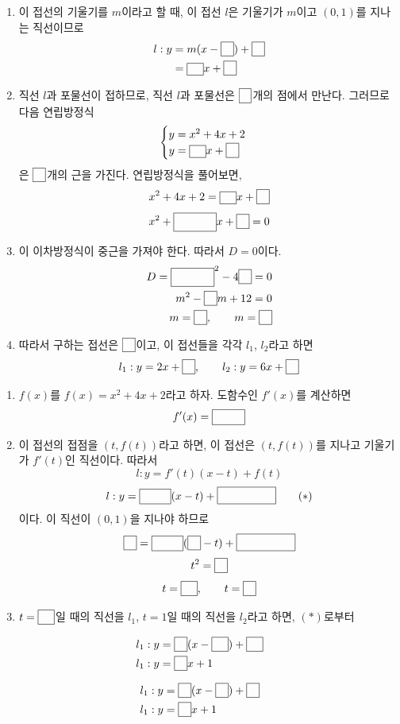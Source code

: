 \documentclass[a4paper]{oblivoir}
\newcounter{num}
\newcommand\pb[1]{\ensuremath{\fbox{\phantom{#1}}}}
\begin{document}
\noindent{}
\begin{enumerate}[(1)]
\item
이 접선의 기울기를 \(m\)이라고 할 때, 이 접선 \(l\)은 기울기가 \(m\)이고 \((0,1)\)를 지나는 직선이므로
\begin{align*}
l:y&=m(x-\pb0)+\pb1\\
&=\pb mx+\pb{1}
\end{align*}
\item
직선 \(l\)과 포물선이 접하므로, 직선 \(l\)과 포물선은 \pb{1}개의 점에서 만난다.
그러므로 다음 연립방정식
\[
\begin{cases}
y=x^2+4x+2\\
y=\pb mx+\pb{1}
\end{cases}
\]
은 \pb{1}개의 근을 가진다.
연립방정식을 풀어보면,
\[x^2+4x+2=\pb mx+\pb{1}\]
\[x^2+\pb{(-m+4)}x+\pb{1}=0\]
\item
이 이차방정식이 중근을 가져야 한다.
따라서 \(D=0\)이다.
\begin{align*}
D=\pb{(-m+4)}^2-4\pb{1}=0\\
m^2-\pb{8}m+12=0\\
m=\pb2,\qquad m=\pb6
\end{align*}
\item
따라서 구하는 접선은 \(\pb2\)이고, 이 접선들을 각각 \(l_1\), \(l_2\)라고 하면
\[l_1:y=2x+\pb{1},\qquad l_2:y=6x+\pb1\]
\end{enumerate}

\noindent{}
\begin{enumerate}[(1)]
\item
\(f(x)\)를 \(f(x)=x^2+4x+2\)라고 하자.
도함수인 \(f'(x)\)를 계산하면
\[f'(x)=\pb{2x+4}\]
\item
이 접선의 접점을 \((t,f(t))\)라고 하면, 이 접선은 \((t,f(t))\)를 지나고 기울기가 \(f'(t)\)인 직선이다.
따라서
\[l:y=f'(t)(x-t)+f(t)\]
\[l:y=\pb{2t+4}(x-t)+\pb{\(t^2+4t+2\)}\tag{\(\ast\)}\]
이다.
이 직선이 \((0,1)\)을 지나야 하므로
\[\pb{1}=\pb{2t+4}(\pb{0}-t)+\pb{\(t^2+4t+2\)}\]
\[t^2=\pb1\]
\[t=\pb{-1},\qquad t=\pb1\]
\item
\(t=\pb{-1}\)일 때의 직선을 \(l_1\), \(t=1\)일 때의 직선을 \(l_2\)라고 하면, \((\ast)\)로부터
\end{enumerate}
\begin{minipage}{0.45\textwidth}
\begin{align*}
l_1:y&=\pb2(x-\pb{-1})+\pb{-1}\\
l_1:y&=\pb2x+1
\end{align*}
\end{minipage}
\begin{minipage}{0.45\textwidth}
\begin{align*}
l_1:y&=\pb6(x-\pb{1})+\pb7\\
l_1:y&=\pb6x+1
\end{align*}
\end{minipage}
\end{document}
